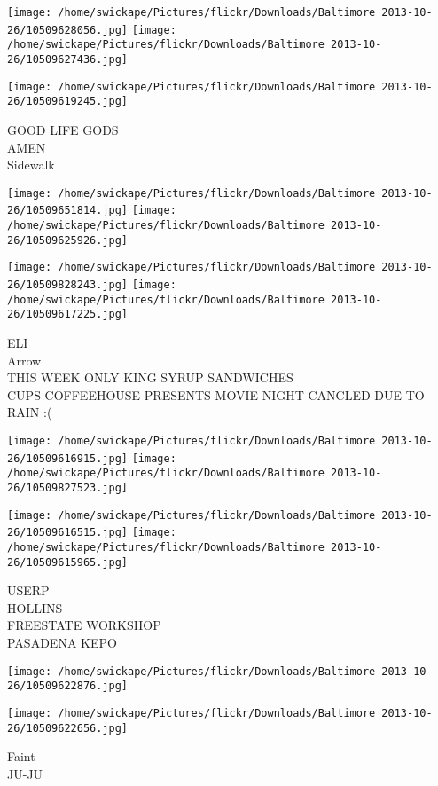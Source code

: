 \documentclass[10pt,letterpaper]{article}
\begin{document}
\texttt{[image: /home/swickape/Pictures/flickr/Downloads/Baltimore 2013-10-26/10509628056.jpg]}
\texttt{[image: /home/swickape/Pictures/flickr/Downloads/Baltimore 2013-10-26/10509627436.jpg]}

\vspace{0.25in}
\texttt{[image: /home/swickape/Pictures/flickr/Downloads/Baltimore 2013-10-26/10509619245.jpg]}

GOOD LIFE GODS\\
AMEN\\
Sidewalk
\pagebreak

\texttt{[image: /home/swickape/Pictures/flickr/Downloads/Baltimore 2013-10-26/10509651814.jpg]}
\texttt{[image: /home/swickape/Pictures/flickr/Downloads/Baltimore 2013-10-26/10509625926.jpg]}

\texttt{[image: /home/swickape/Pictures/flickr/Downloads/Baltimore 2013-10-26/10509828243.jpg]}
\texttt{[image: /home/swickape/Pictures/flickr/Downloads/Baltimore 2013-10-26/10509617225.jpg]}

ELI\\
Arrow\\
THIS WEEK ONLY KING SYRUP SANDWICHES\\
CUPS COFFEEHOUSE PRESENTS MOVIE NIGHT CANCLED DUE TO RAIN :(
\pagebreak

\texttt{[image: /home/swickape/Pictures/flickr/Downloads/Baltimore 2013-10-26/10509616915.jpg]}
\texttt{[image: /home/swickape/Pictures/flickr/Downloads/Baltimore 2013-10-26/10509827523.jpg]}

\texttt{[image: /home/swickape/Pictures/flickr/Downloads/Baltimore 2013-10-26/10509616515.jpg]}
\texttt{[image: /home/swickape/Pictures/flickr/Downloads/Baltimore 2013-10-26/10509615965.jpg]}

USERP\\
HOLLINS\\
FREESTATE WORKSHOP\\
PASADENA KEPO
\pagebreak

\texttt{[image: /home/swickape/Pictures/flickr/Downloads/Baltimore 2013-10-26/10509622876.jpg]}

\vspace{0.25in}
\texttt{[image: /home/swickape/Pictures/flickr/Downloads/Baltimore 2013-10-26/10509622656.jpg]}

Faint\\
JU{-}JU
\pagebreak
\end{document}
